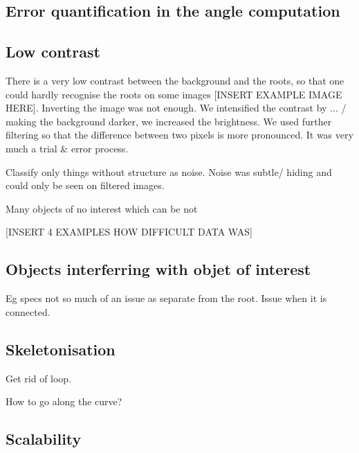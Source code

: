 \subsection{Error quantification in the angle computation}


\subsection{Low contrast}

There is a very low contrast between the background and the roots, so that one could hardly recognise the roots on some images [INSERT EXAMPLE IMAGE HERE].
Inverting the image was not enough. We intensified the contrast by ... / making the background darker, we increased the brightness. We used further filtering so that the difference between two pixels is more pronounced.
It was very much a trial \& error process.

Classify only things without structure as noise. 
Noise was subtle/ hiding and could only be seen on filtered images.

Many objects of no interest which can be not 


[INSERT 4 EXAMPLES HOW DIFFICULT DATA WAS]


\subsection{Objects interferring with objet of interest}

Eg specs not so much of an issue as separate from the root.
Issue when it is connected.


\subsection{Skeletonisation}
Get rid of loop.

How to go along the curve?


\subsection{Scalability}

